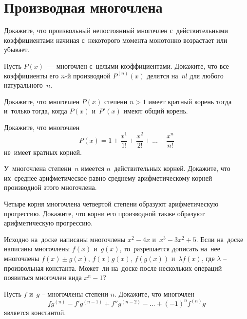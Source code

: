 
\section*{Производная многочлена}


\begin{problems}

\item
Докажите, что произвольный непостоянный многочлен с~действительными
коэффициентами начиная с~некоторого момента монотонно возрастает или убывает.

\item
Пусть $P(x)$~--- многочлен с~целыми коэффициентами.
Докажите, что все коэффициенты его $n$-й производной $P^{(n)}(x)$ делятся
на~$n!$ для любого натурального~$n$.


\item
Докажите, что многочлен $P(x)$ степени $n > 1$ имеет кратный корень тогда
и~только тогда, когда $P(x)$ и~$P'(x)$ имеют общий корень.

\item
Докажите, что многочлен
\[
    P(x)
=
    1 + \frac{x^1}{1!} + \frac{x^2}{2!} + \ldots + \frac{x^n}{n!}
\]
не~имеет кратных корней.

\item
У~многочлена степени~$n$ имеется $n$~действительных корней.
Докажите, что их~среднее арифметическое равно среднему арифметическому корней
производной этого многочлена.

\item
Четыре корня многочлена четвертой степени образуют арифметическую прогрессию.
Докажите, что корни его производной также образуют арифметическую прогрессию.

\item
Исходно на~доске написаны многочлены $x^2 - 4 x$ и~$x^3 - 3 x^2 + 5$.
Если на~доске написаны многочлены $f(x)$ и~$g(x)$, то~разрешается дописать
на~нее многочлены $f(x) \pm g(x)$, $f(x) g(x)$, $f(g(x))$
и~$\lambda f(x)$, где $\lambda$ -- произвольная константа.
Может~ли на~доске после нескольких операций появиться многочлен вида $x^n-1$?

\item
Пусть $f$ и~$g$ -- многочлены степени $n$.
Докажите, что многочлен
\[
    f g^{(n)} - f' g^{(n-1)} + f'' g^{(n-2)} - \ldots + (-1)^n f^{(n)} g
\]
является константой.


\end{problems}
